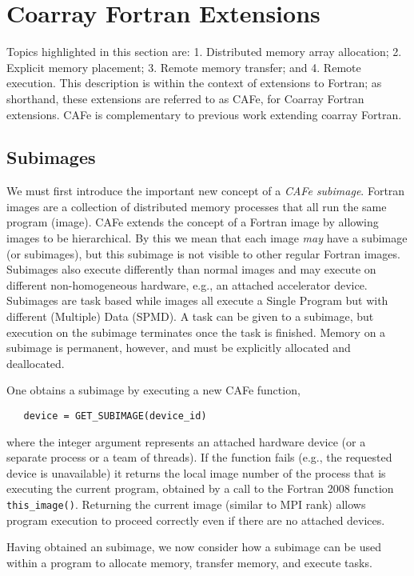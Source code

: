 \section{Coarray Fortran Extensions}

Topics highlighted in this section are: 1. Distributed memory array allocation;
2. Explicit memory placement; 3. Remote memory transfer; and 4. Remote execution.  This
description is within the context of extensions to Fortran; as shorthand, these extensions
are referred to as CAFe, for Coarray Fortran extensions.  CAFe is complementary to
previous work extending coarray Fortran\cite{mellor-crummey:2009:caf2,jin:2011:caf2}.


\subsection{Subimages}

We must first introduce the important new concept of a \emph{CAFe subimage}.  Fortran
images are a collection of distributed memory processes that all run the same program
(image).  CAFe extends the concept of a Fortran image by allowing images to be
hierarchical.  By this we mean that each image \emph{may} have a subimage (or subimages),
but this subimage is not visible to other regular Fortran images.  Subimages also execute
differently than normal images and may execute on different non-homogeneous hardware,
e.g., an attached accelerator device.  Subimages are task based while images all execute a
Single Program but with different (Multiple) Data (SPMD).  A task can be given to a
subimage, but execution on the subimage terminates once the task is finished.  Memory on a
subimage is permanent, however, and must be explicitly allocated and deallocated.

One obtains a subimage by executing a new CAFe function,
\begin{verbatim}
   device = GET_SUBIMAGE(device_id)
\end{verbatim}
where the integer argument represents an attached hardware device (or a separate process
or a team of threads).  If the function fails (e.g., the requested device is unavailable)
it returns the local image number of the process that is executing the
current program, obtained by a call to the Fortran 2008 function \texttt{this\_image()}.
Returning the current image (similar to MPI rank) allows program execution to proceed
correctly even if there are no attached devices.

Having obtained an subimage, we now consider how a subimage can be used within a program
to allocate memory, transfer memory, and execute tasks.


